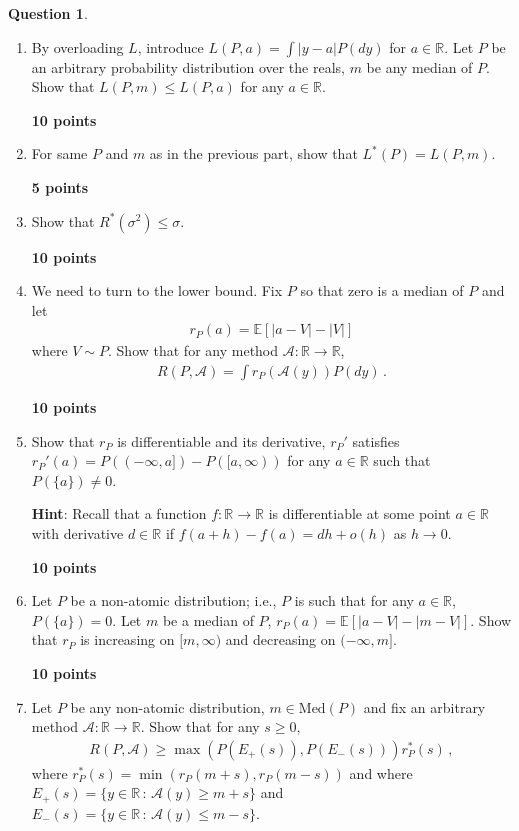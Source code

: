 \documentclass{article}
\newcommand{\R}{\mathbb{R}}
\DeclareMathOperator*{\1}{\mathbbm{1}}
\newcommand{\E}{\mathbb E}
\newcommand{\EE}[1]{\E[#1]}
\newcounter{DocPoints}
\newcounter{QuestionPoints}
\newcommand{\points}[1]{	\par\mbox{}\par\noindent\hfill {\bf #1 points}	\addtocounter{DocPoints}{#1}
	\addtocounter{QuestionPoints}{#1}
}
\theoremstyle{definition}
\newtheorem{question}{Question}
\theoremstyle{remark}
\newcommand{\hint}{\noindent \textbf{Hint}:\xspace}
\newcommand{\cA}{\mathcal{A}}
\begin{document}
\begin{question}
\begin{enumerate}[(Q1)]
\points{10}

\item By overloading $L$, introduce $L(P,a) = \int |y-a| P(dy)$ for $a\in \R$. Let $P$ be an arbitrary probability distribution over the reals, $m$ be any median of $P$. Show that 
$L(P,m)\le L(P,a)$ for any $a\in \R$.

\points{10}
\item For same $P$ and $m$ as in the previous part,
show that $L^*(P)=L(P,m)$.

\points{5}

\item Show that $R^*(\sigma^2) \le \sigma$.
\points{10}

\item We need to turn to the lower bound. 
Fix  $P$ so that zero is a median of $P$ and let
\begin{align*}
r_P(a) = \EE{|a-V|-|V|}
\end{align*}
where $V\sim P$.
Show that for any method $\cA:\R \to \R$,
\begin{align}\label{eq:riskexp}
R(P,\cA) = \int r_P(\cA(y)) P(dy) \,.
\end{align}

\points{10}
\item Show that $r_P$ is differentiable and its derivative, $r_P'$ satisfies $r_P'(a) = P((-\infty,a])-P([a,\infty))$ for any $a\in \R$ such that $P(\{a\})\ne 0$.

\hint Recall that a function $f:\R \to \R$ is differentiable at some point $a\in \R$ with derivative $d\in \R$ if $f(a+h) - f(a) = d h + o(h)$ as $h\to 0$.

\points{10}

\item Let $P$ be a non-atomic distribution; i.e., $P$ is such that for any $a\in \R$, $P(\{a\}) = 0$.
Let $m$ be a median of $P$, $r_P(a) = \EE{ |a-V|-|m-V|}$.
Show that $r_P$ is increasing on $[m,\infty)$ and decreasing on $(-\infty,m]$.

\points{10}

\item \label{p:risk2prob}

Let  $P $ be any non-atomic distribution, $m\in \text{Med}(P)$ and fix an arbitrary method $\cA:\R \to \R$. Show that for any $s\ge 0$,
\begin{align}\label{eq:risklblap}
R(P,\cA) \ge  \max( P(E_+(s)),P(E_-(s))) r^*_P(s)\,,
\end{align}
where $r^*_P(s) = \min(r_P(m+s),r_P(m-s))$ and
where $E_+(s) = \{y\in \R\,:\, \cA(y)\ge m+ s\}$
and $E_-(s) = \{y\in \R\,:\, \cA(y)\le m- s\}$.


\end{enumerate}
\end{question}
\end{document}
